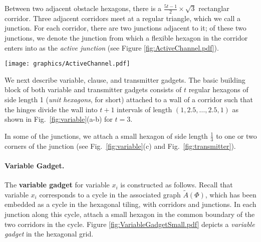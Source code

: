 Between two adjacent obstacle hexagons, there is a $\frac{5t-1}{2}\times \sqrt{3}$ rectanglar corridor.  %
Three adjacent corridors meet at a regular triangle, which we call a junction. 
For each corridor, there are two junctions adjacent to it; of these two junctions, we denote the junction from which a flexible hexagon in the corridor enters into as the \textit{active junction} (see Figure \ref{fig:ActiveChannel.pdf}).

\begin{minipage}{\linewidth}
\begin{center}
\texttt{[image: graphics/ActiveChannel.pdf]}
\label{fig:ActiveChannel.pdf}
\end{center}
\end{minipage}

We next describe variable, clause, and transmitter gadgets.
The basic building block of both variable and transmitter gadgets consists of $t$ regular hexagons of side length 1 (\emph{unit hexagons}, for short) attached to a wall of a corridor such that the hinges divide the wall into $t+1$ intervals of length $(1,2.5,\ldots ,2.5,1)$ as shown in Fig.~\ref{fig:variable}(a-b) for $t=3$. 

In some of the junctions, we attach a small hexagon of side length $\frac{1}{3}$ to one or two corners of the junction (see Fig.~\ref{fig:variable}(c) and Fig.~\ref{fig:transmitter}). 

\paragraph{Variable Gadget.}
The {\bf variable gadget} for variable $x_i$ is constructed as follows. 
Recall that variable $x_i$ corresponds to a cycle in the associated graph $\tilde{A}(\Phi)$, which has been embedded as a cycle in the hexagonal tiling, with corridors and junctions. 
In each junction along this cycle, attach a small hexagon in the common boundary of the two corridors in the cycle. 
Figure \ref{fig:VariableGadgetSmall.pdf} depicts a \textit{variable gadget} in the hexagonal grid.

